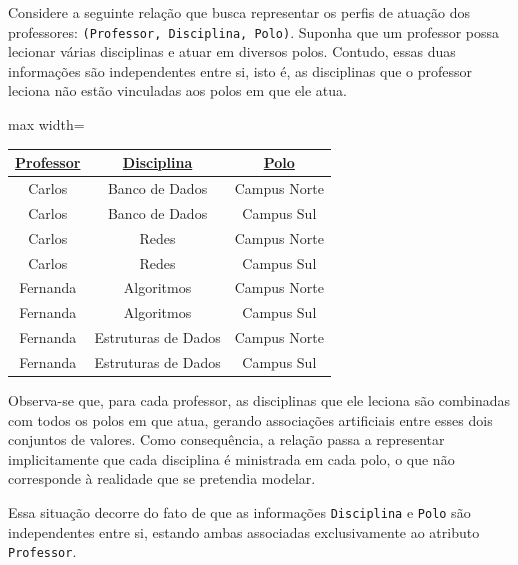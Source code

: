 \begin{tcolorbox}[breakable, colback=blue!5,colframe=blue!40!black,title=Situação exemplo]

Considere a seguinte relação que busca representar os perfis de atuação dos professores: \texttt{(Professor, Disciplina, Polo)}. Suponha que um professor possa lecionar várias disciplinas e atuar em diversos polos. Contudo, essas duas informações são independentes entre si, isto é, as disciplinas que o professor leciona não estão vinculadas aos polos em que ele atua.

\vspace{0.4cm}

\centering
\renewcommand{\arraystretch}{1.2}

\begin{adjustbox}{max width=\textwidth}
\begin{tabular}{|c|c|c|}
\hline
\textbf{\underline{Professor}} & \textbf{\underline{Disciplina}} & \textbf{\underline{Polo}} \\ \hline
Carlos & Banco de Dados & Campus Norte \\ \hline
Carlos & Banco de Dados & Campus Sul \\ \hline
Carlos & Redes & Campus Norte \\ \hline
Carlos & Redes & Campus Sul \\ \hline
Fernanda & Algoritmos & Campus Norte \\ \hline
Fernanda & Algoritmos & Campus Sul \\ \hline
Fernanda & Estruturas de Dados & Campus Norte \\ \hline
Fernanda & Estruturas de Dados & Campus Sul \\ \hline
\end{tabular}
\end{adjustbox}
\vspace{0.3cm}
\label{tab:4fn_exemplo}

\vspace{0.4cm}

\justify

Observa-se que, para cada professor, as disciplinas que ele leciona são combinadas com todos os polos em que atua, gerando associações artificiais entre esses dois conjuntos de valores. Como consequência, a relação passa a representar implicitamente que cada disciplina é ministrada em cada polo, o que não corresponde à realidade que se pretendia modelar.

Essa situação decorre do fato de que as informações \texttt{Disciplina} e \texttt{Polo} são independentes entre si, estando ambas associadas exclusivamente ao atributo \texttt{Professor}.


\end{tcolorbox}
